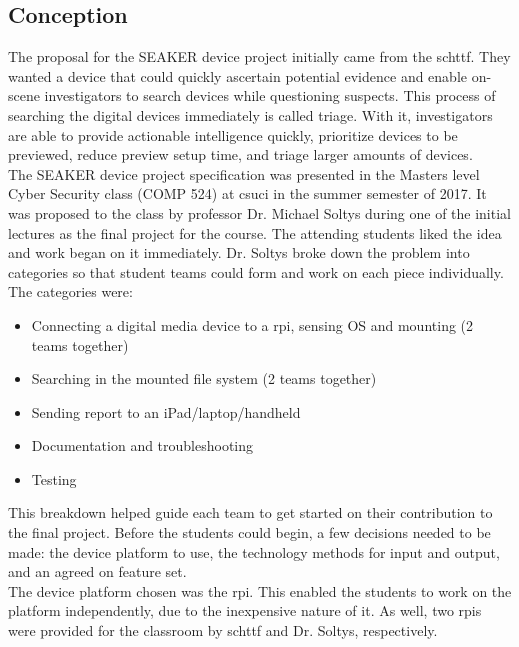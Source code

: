 \documentclass[12pt]{article}
\begin{document}
\subsection{Conception}

The proposal for the SEAKER device project initially came from the \gls{schttf}.  They wanted
a device that could quickly ascertain potential evidence and enable on-scene investigators
to search devices while questioning suspects.  This process of searching the digital devices
immediately is called triage.  With it, investigators are able to provide actionable
intelligence quickly, prioritize devices to be previewed, reduce preview setup time, and
triage larger amounts of devices.\\

The SEAKER device project specification was presented in the Masters level Cyber
Security class (COMP 524) at \gls{csuci} in the summer semester of 2017.  It was
proposed to the class by professor Dr. Michael Soltys during one of the initial
lectures as the final project for the course.  The attending students liked the idea
and work began on it immediately.
Dr. Soltys broke down the problem into categories so that student teams could form and
work on each piece individually.  The categories were:

\vspace{0.5 cm}
\begin{itemize}
  \item Connecting a digital media device to a \gls{rpi}, sensing OS and mounting (2 teams together)
  \item Searching in the mounted file system (2 teams together)
  \item Sending report to an iPad/laptop/handheld
  \item Documentation and troubleshooting
  \item Testing
\end{itemize}
\vspace{0.5 cm}

This breakdown helped guide each team to get started on their contribution to the
final project.  Before the students could begin, a few decisions needed to be made:
the device platform to use, the technology methods for input and output, and an
agreed on feature set.\\

The device platform chosen was the \gls{rpi}.  This enabled the students to work on the platform
independently, due to the inexpensive nature of it.  As well, two \glspl{rpi} were provided
for the classroom by \gls{schttf} and Dr. Soltys, respectively.\\
\end{document}
